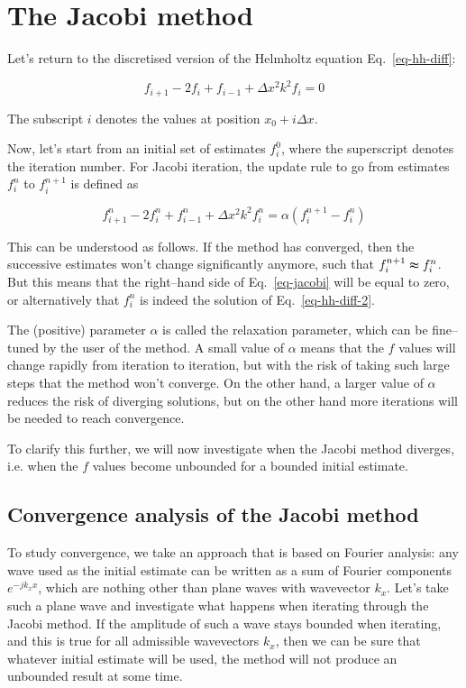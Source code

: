 \pagebreak

\section{The Jacobi method}

Let's return to the discretised version of the Helmholtz equation Eq.~\ref{eq-hh-diff}:

\begin{equation}
f_{i+1} -2 f_i + f_{i-1} +  \Delta x^2 k^2 f_i = 0 \label{eq-hh-diff-2}
\end{equation}  

The subscript $i$ denotes the values at position $x_0 + i \Delta x$.

Now, let's start from an initial set of estimates $f_i^0$, where the superscript denotes the iteration number. For Jacobi iteration, the update rule to go from estimates $f_i^n$ to $ f_i^{n+1}$ is defined as

\begin{equation}
f_{i+1}^n -2 f_i^n + f_{i-1}^n +  \Delta x^2 k^2 f_i^n = \alpha (f_i^{n+1} - f_i^n ) \label{eq-jacobi}
\end{equation}  

This can be understood as follows. If the method has converged, then the successive estimates won't change significantly anymore, such that $ f_i^{n+1} \thickapprox f_i^n $. But this means that the right--hand side of Eq.~\ref{eq-jacobi} will be equal to zero, or alternatively that $f_i^n$ is indeed the solution of Eq.~\ref{eq-hh-diff-2}.

The (positive) parameter $\alpha$ is called the relaxation parameter, which can be fine--tuned by the user of the method. A small value of $\alpha$ means that the $f$ values will change rapidly from iteration to iteration, but with the risk of taking such large steps that the method won't converge. On the other hand, a larger value of $\alpha$ reduces the risk of diverging solutions, but on the other hand more iterations will be needed to reach convergence.

To clarify this further, we will now investigate when the Jacobi method diverges, i.e. when the $f$ values become unbounded for a bounded initial estimate.

\subsection{Convergence analysis of the Jacobi method}

To study convergence, we take an approach that is based on Fourier analysis: any wave used as the initial estimate can be written as a sum of Fourier components $e^{-j k_x x}$, which are nothing other than plane waves with wavevector $k_x$. Let's take such a plane wave and investigate what happens when iterating through the Jacobi method. If the amplitude of such a wave stays bounded when iterating, and this is true for all admissible wavevectors $k_x$, then we can be sure that whatever initial estimate will be used, the method will not produce an unbounded result at some time.

